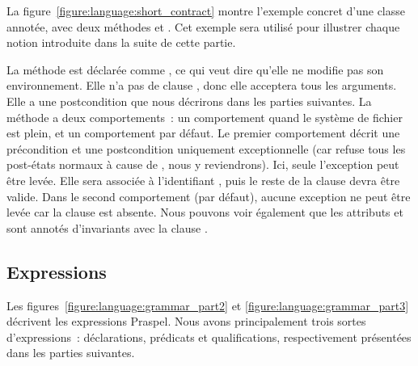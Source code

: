 \begin{example} La
figure~\ref{figure:language:short_contract} montre l'exem\-ple concret d'une
classe  annotée, avec deux méthodes  et
. Cet exemple sera utilisé pour illustrer chaque notion introduite
dans la suite de cette partie.

La méthode  est déclarée comme , ce qui veut dire
qu'elle ne modifie pas son environnement. Elle n'a pas de clause \arequires,
donc elle acceptera tous les arguments. Elle a une postcondition que nous
décrirons dans les parties suivantes. La méthode  a deux
comportements~: un comportement  quand le système de fichier est
plein, et un comportement par défaut. Le premier comportement décrit une
précondition et une postcondition uniquement exceptionnelle (car \aensures
refuse tous les post-états normaux à cause de \anone, nous y reviendrons).
Ici, seule l'exception  peut être levée. Elle sera
associée à l'identifiant , puis le reste de la clause devra être valide.
Dans le second comportement (par défaut), aucune exception ne peut être levée
car la clause \athrowable est absente. Nous pouvons voir également que les
attributs  et  sont annotés d'invariants avec la
clause \ainvariant.

\end{example}

\subsection{Expressions}
\label{subsection:language:expressions}

Les figures~\ref{figure:language:grammar_part2} et
\ref{figure:language:grammar_part3} décrivent les expressions Praspel. Nous
avons principalement trois sortes d'expressions~: déclarations, prédicats et
qualifications, respectivement présentées dans les parties suivantes.

